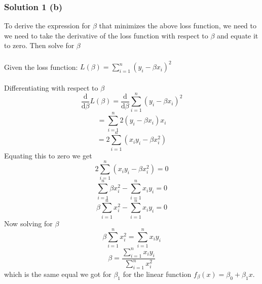 \documentclass{assignment}
\begin{document}
\begin{problem}
\subsubsection*{Solution 1 (b)}

\noindent To derive the expression for $\beta$ that minimizes the above loss function, we need to we need to take the derivative of the loss function with respect to $\beta$ and  equate it to zero. Then solve for $\beta$
\\
\\
Given the loss function: $L(\beta) = \sum_{i=1}^{n} (y_i -  \beta x_i)^2$
\\
\\
Differentiating with respect to $\beta$
\begin{equation}\label{eq:Equation}
     \frac{\mathrm{d}}{\mathrm{d}\beta}L(\beta) = \frac{\mathrm{d}}{\mathrm{d}\beta} \sum_{i=1}^{n} (y_i -  \beta x_i)^2
\end{equation}
\begin{equation}\label{eq:Equation}
     = \sum_{i=1}^{n} 2(y_i -  \beta x_i)x_i
\end{equation}
\begin{equation}\label{eq:Equation}
     = 2\sum_{i=1}^{n} (x_iy_i -  \beta x_i^2)
\end{equation}
Equating this to zero we get
\begin{equation}\label{eq:Equation}
     2\sum_{i=1}^{n} (x_iy_i -  \beta x_i^2) = 0
\end{equation}
\begin{equation}\label{eq:Equation}
     \sum_{i=1}^{n}\beta x_i^2 - \sum_{i=1}^{n}x_iy_i = 0
\end{equation}
\begin{equation}\label{eq:Equation}
     \beta \sum_{i=1}^{n} x_i^2 - \sum_{i=1}^{n}x_iy_i = 0
\end{equation}
Now solving for $\beta$
\begin{equation}\label{eq:Equation}
     \beta \sum_{i=1}^{n} x_i^2 = \sum_{i=1}^{n}x_iy_i
\end{equation}
\begin{equation}\label{eq:Equation}
     \beta = \frac{\sum_{i=1}^{n}x_iy_i}{\sum_{i=1}^{n} x_i^2}
\end{equation}
which is the same equal we got for $\beta_1$ for the linear function 
$f_\beta(x) = \beta_0 + \beta_1 x$.

\end{problem}
\end{document}
